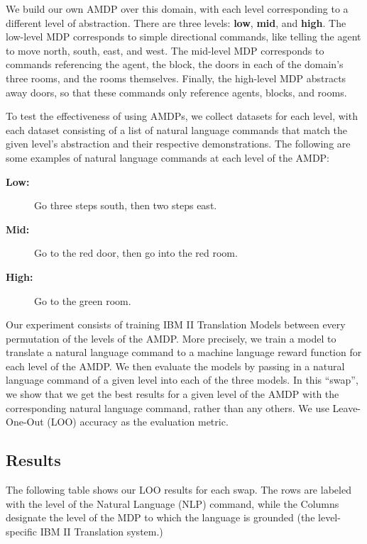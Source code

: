 \documentclass[conference]{IEEEtran}
\begin{document}
We build our own AMDP over this domain, with each level corresponding to a different level of abstraction. There are three levels: \textbf{low}, \textbf{mid}, and \textbf{high}. The low-level MDP corresponds to simple directional commands, like telling the agent to move north, south, east, and west. The mid-level MDP corresponds to commands referencing the agent, the block, the doors in each of the domain's three rooms, and the rooms themselves. Finally, the high-level MDP abstracts away doors, so that these commands only reference agents, blocks, and rooms.

To test the effectiveness of using AMDPs, we collect datasets for each level, with each dataset consisting of a list of natural language commands that match the given level's abstraction and their respective demonstrations. The following are some examples of natural language commands at each level of the AMDP:

\begin{description}
\item[\textbf{Low:}] Go three steps south, then two steps east.
\item[\textbf{Mid:}] Go to the red door, then go into the red room.
\item[\textbf{High:}] Go to the green room.
\end{description}

Our experiment consists of training IBM II Translation Models between every permutation of the levels of the AMDP. More precisely, we train a model to translate a natural language command to a machine language reward function for each level of the AMDP. We then evaluate the models by passing in a natural language command of a given level into each of the three models. In this ``swap'', we show that we get the best results for a given level of the AMDP with the corresponding natural language command, rather than any others. We use Leave-One-Out (LOO) accuracy as the evaluation metric.

\subsection{Results}

The following table shows our LOO results for each swap. The rows are labeled with the level of the Natural Language (NLP) command, while the Columns designate the level of the MDP to which the language is grounded (the level-specific IBM II Translation system.)
\end{document}
